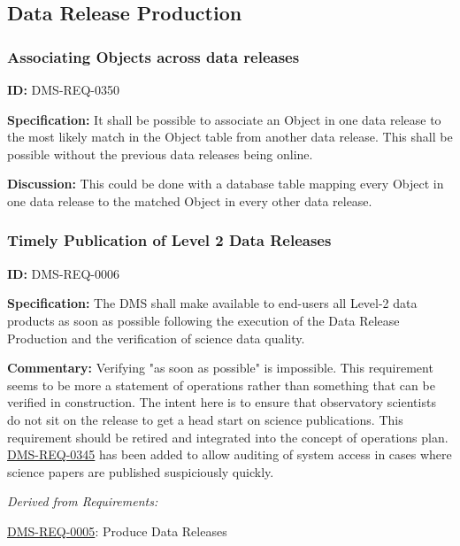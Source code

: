 \documentclass[SE,toc,lsstdraft]{lsstdoc}
\begin{document}
\subsection{Data Release Production}





\subsubsection{Associating Objects across data releases}

\label{DMS-REQ-0350}
\textbf{ID:} DMS-REQ-0350

\textbf{Specification:} It shall be possible to associate an Object in one data release to the most likely match in the Object table from another data release. This shall be possible without the previous data releases being online.

\textbf{Discussion:} This could be done with a database table mapping every Object in one data release to the matched Object in every other data release.




\subsubsection{Timely Publication of Level 2 Data Releases}

\label{DMS-REQ-0006}
\textbf{ID:} DMS-REQ-0006

\textbf{Specification:} The DMS shall make available to end-users all Level-2 data products as soon as possible following the execution of the Data Release Production and the verification of science data quality.

\textbf{Commentary: }Verifying "as soon as possible" is impossible. This requirement seems to be more a statement of operations rather than something that can be verified in construction. The intent here is to ensure that observatory scientists do not sit on the release to get a head start on science publications. This requirement should be retired and integrated into the concept of operations plan. \hyperref[DMS-REQ-0345]{DMS-REQ-0345} has been added to allow auditing of system access in cases where science papers are published suspiciously quickly.






\emph{Derived from Requirements:}

\hyperref[DMS-REQ-0005]{DMS-REQ-0005}:
Produce Data Releases \newline
\end{document}
